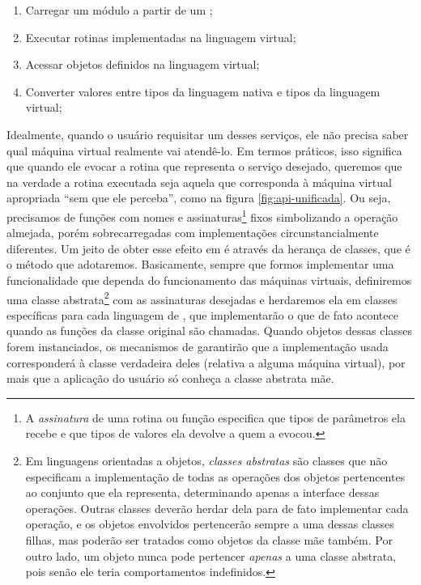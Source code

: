     \begin{enumerate}
      \item Carregar um módulo a partir de um \script{};
      \item Executar rotinas implementadas na linguagem virtual;
      \item Acessar objetos definidos na linguagem virtual;
      \item Converter valores entre tipos da linguagem nativa e tipos da
            linguagem virtual;
    \end{enumerate}

    Idealmente, quando o usuário requisitar um desses serviços, ele não precisa
    saber qual máquina virtual realmente vai atendê-lo. Em termos práticos, isso
    significa que quando ele evocar a rotina que representa o serviço desejado,
    queremos que na verdade a rotina executada seja aquela que corresponda à
    máquina virtual apropriada ``sem que ele perceba'', como na figura
    \ref{fig:api-unificada}. Ou seja, precisamos de funções com nomes e
    assinaturas\footnote{A
      \emph{assinatura} de uma rotina ou função especifica que tipos de
      parâmetros ela recebe e que tipos de valores ela devolve a quem a
      evocou.
    } fixos simbolizando a operação almejada, porém
    sobrecarregadas com implementações circunstancialmente diferentes. Um jeito
    de obter esse efeito em \CXX{} é através da herança de classes, que é o
    método que adotaremos. Basicamente, sempre que formos implementar uma
    funcionalidade que dependa do funcionamento das máquinas virtuais,
    definiremos uma classe abstrata\footnote{Em
      linguagens orientadas a objetos, \emph{classes abstratas} são classes
      que não especificam a implementação de todas as operações dos objetos
      pertencentes ao conjunto que ela representa, determinando apenas a
      interface dessas operações. Outras classes deverão herdar dela para
      de fato implementar cada operação, e os objetos envolvidos pertencerão
      sempre a uma dessas classes filhas, mas poderão ser tratados como objetos
      da classe mãe também. Por outro lado, um objeto nunca pode pertencer
      \emph{apenas} a uma classe abstrata, pois senão ele teria comportamentos
      indefinidos.
    } com as assinaturas desejadas e herdaremos
    ela em classes específicas para cada linguagem de \script{}, que
    implementarão o que de fato acontece quando as funções da classe original
    são chamadas. Quando objetos dessas classes forem instanciados, os
    mecanismos de \CXX{} garantirão que a implementação usada corresponderá à
    classe verdadeira deles (relativa a alguma máquina virtual), por mais que a
    aplicação do usuário só conheça a classe abstrata mãe.

